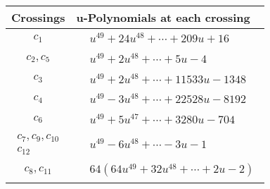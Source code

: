 \documentclass[1p]{elsarticle_modified}
\theoremstyle{definition}
\begin{document}
\begin{tabular}{m{50pt}|m{274pt}}
Crossings & \hspace{64pt}u-Polynomials at each crossing \\
\hline $$\begin{aligned}c_{1}\end{aligned}$$&$\begin{aligned}
&u^{49}+24 u^{48}+\cdots+209 u+16
\end{aligned}$\\
\hline $$\begin{aligned}c_{2},c_{5}\end{aligned}$$&$\begin{aligned}
&u^{49}+2 u^{48}+\cdots+5 u-4
\end{aligned}$\\
\hline $$\begin{aligned}c_{3}\end{aligned}$$&$\begin{aligned}
&u^{49}+2 u^{48}+\cdots+11533 u-1348
\end{aligned}$\\
\hline $$\begin{aligned}c_{4}\end{aligned}$$&$\begin{aligned}
&u^{49}-3 u^{48}+\cdots+22528 u-8192
\end{aligned}$\\
\hline $$\begin{aligned}c_{6}\end{aligned}$$&$\begin{aligned}
&u^{49}+5 u^{47}+\cdots+3280 u-704
\end{aligned}$\\
\hline $$\begin{aligned}c_{7},c_{9},c_{10}\\c_{12}\end{aligned}$$&$\begin{aligned}
&u^{49}-6 u^{48}+\cdots-3 u-1
\end{aligned}$\\
\hline $$\begin{aligned}c_{8},c_{11}\end{aligned}$$&$\begin{aligned}
&64(64 u^{49}+32 u^{48}+\cdots+2 u-2)
\end{aligned}$\\
\hline
\end{tabular}\\~\\
\end{document}
